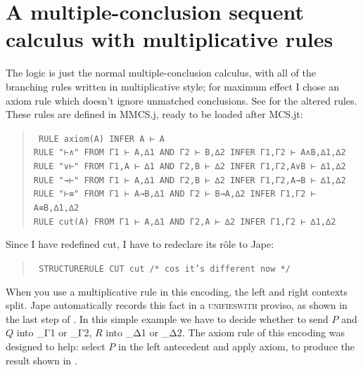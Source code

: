\section{A multiple-conclusion sequent calculus with multiplicative rules}

The logic is just the normal multiple-conclusion calculus, with all of the branching rules written in multiplicative style; for maximum effect I chose an axiom rule which doesn't ignore unmatched conclusions. See  for the altered rules. These rules are defined in MMCS.j, ready to be loaded after MCS.jt:
\begin{quote}\tt\small
RULE    axiom(A)                                    INFER A ⊢ A\\
RULE    "⊢∧"        FROM Γ1 ⊢ A,∆1 AND Γ2 ⊢ B,∆2        INFER Γ1,Γ2 ⊢ A∧B,∆1,∆2\\
RULE    "∨⊢"        FROM Γ1,A ⊢ ∆1 AND Γ2,B ⊢ ∆2        INFER Γ1,Γ2,A∨B ⊢ ∆1,∆2\\
RULE    "→⊢"        FROM Γ1 ⊢ A,∆1 AND Γ2,B ⊢ ∆2        INFER Γ1,Γ2,A→B ⊢ ∆1,∆2\\
RULE    "⊢≡"        FROM Γ1 ⊢ A→B,∆1 AND Γ2 ⊢ B→A,∆2  INFER Γ1,Γ2 ⊢ A≡B,∆1,∆2\\
RULE    cut(A)        FROM Γ1 ⊢ A,∆1 AND Γ2,A ⊢ ∆2        INFER Γ1,Γ2 ⊢ ∆1,∆2
\end{quote}

Since I have redefined cut, I have to redeclare its r\^{o}le to Jape:
\begin{quote}\tt\small
STRUCTURERULE CUT                   cut /* cos it's different now */
\end{quote}

When you use a multiplicative rule in this encoding, the left and right contexts split. Jape automatically records this fact in a \textsc{unifieswith} proviso, as shown in the last step of . In this simple example we have to decide whether to send $P$ and $Q$ into \_Γ1 or \_Γ2, $R$ into \_Δ1 or \_Δ2. The axiom rule of this encoding was designed to help: select $P$ in the left antecedent and apply axiom, to produce the result shown in .

